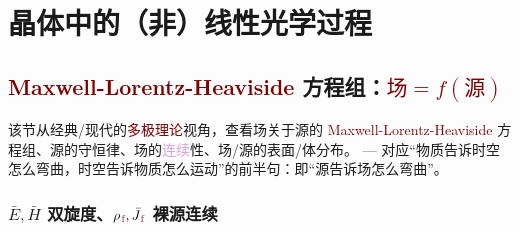 \chapter{晶体中的（非）线性光学过程}\label{chap:N/LCO}

\vspace*{-8.5em}

\section{\textcolor{Maroon}{Maxwell-Lorentz-Heaviside} 方程组：\textcolor{Maroon}{$\text{场} = f(\text{源})$}}\label{sec:maxwell}

该节从经典/现代的\textcolor{Maroon}{多极理论}视角，查看场关于源的 \textcolor{Maroon}{Maxwell-Lorentz-Heaviside} 方程组、源的守恒律、场的\textcolor{Plum}{连续}性、场/源的表面/体分布。 --- 对应“物质告诉时空怎么弯曲，时空告诉物质怎么运动”的前半句：即“源告诉场怎么弯曲”。

\vspace*{-5.0em}

\subsection{$\bar{E},\bar{H}$ 双旋度、${\rho}_{\;\!\textcolor{Maroon}{\text{f}}}, \bar{J}_{\;\!\textcolor{Maroon}{\text{f}}}$ 裸源连续}\label{ssec:EHpJf}

